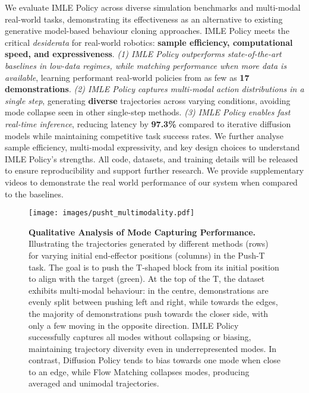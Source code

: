 We evaluate IMLE Policy across diverse simulation benchmarks and multi-modal real-world tasks, demonstrating its effectiveness as an alternative to existing generative model-based behaviour cloning approaches. IMLE Policy meets the critical \textit{desiderata} for real-world robotics: \textbf{sample efficiency, computational speed, and expressiveness}. \textit{(1) IMLE Policy outperforms state-of-the-art baselines in low-data regimes, while matching performance when more data is available}, learning performant real-world policies from as few as \textbf{17 demonstrations}. \textit{(2) IMLE Policy captures multi-modal action distributions in a single step}, generating \textbf{diverse} trajectories across varying conditions, avoiding mode collapse seen in other single-step methods. \textit{(3) IMLE Policy enables fast real-time inference}, reducing latency by \textbf{97.3\%} compared to iterative diffusion models while maintaining competitive task success rates. We further analyse sample efficiency, multi-modal expressivity, and key design choices to understand IMLE Policy’s strengths. All code, datasets, and training details will be released to ensure reproducibility and support further research. We provide supplementary videos to demonstrate the real world performance of our system when compared to the baselines.




\begin{figure*}[t]
    \centering
    \texttt{[image: images/pusht\_multimodality.pdf]}
    \caption{\textbf{Qualitative Analysis of Mode Capturing 
    Performance.} Illustrating the trajectories generated by different methods (rows) for varying initial end-effector positions (columns) in the Push-T task. The goal is to push the T-shaped block from its initial position to align with the target (green). At the top of the T, the dataset exhibits multi-modal behaviour: in the centre, demonstrations are evenly split between pushing left and right, while towards the edges, the majority of demonstrations push towards the closer side, with only a few moving in the opposite direction. IMLE Policy successfully captures all modes without collapsing or biasing, maintaining trajectory diversity even in underrepresented modes. In contrast, Diffusion Policy tends to bias towards one mode when close to an edge, while Flow Matching collapses modes, producing averaged and unimodal trajectories.}
    \label{fig:pusht_multimodality}
\end{figure*}



